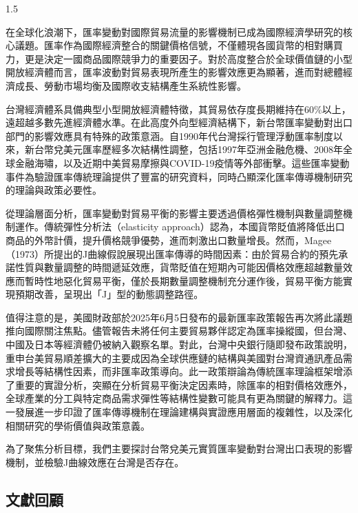 \documentclass[a4paper,12pt]{article}
\begin{document}
\begin{spacing}{1.5}

在全球化浪潮下，匯率變動對國際貿易流量的影響機制已成為國際經濟學研究的核心議題。匯率作為國際經濟整合的關鍵價格信號，不僅體現各國貨幣的相對購買力，更是決定一國商品國際競爭力的重要因子。對於高度整合於全球價值鏈的小型開放經濟體而言，匯率波動對貿易表現所產生的影響效應更為顯著，進而對總體經濟成長、勞動市場均衡及國際收支結構產生系統性影響。

台灣經濟體系具備典型小型開放經濟體特徵，其貿易依存度長期維持在60\%以上，遠超越多數先進經濟體水準。在此高度外向型經濟結構下，新台幣匯率變動對出口部門的影響效應具有特殊的政策意涵。自1990年代台灣採行管理浮動匯率制度以來，新台幣兌美元匯率歷經多次結構性調整，包括1997年亞洲金融危機、2008年全球金融海嘯，以及近期中美貿易摩擦與COVID-19疫情等外部衝擊。這些匯率變動事件為驗證匯率傳統理論提供了豐富的研究資料，同時凸顯深化匯率傳導機制研究的理論與政策必要性。

從理論層面分析，匯率變動對貿易平衡的影響主要透過價格彈性機制與數量調整機制運作。傳統彈性分析法（elasticity approach）認為，本國貨幣貶值將降低出口商品的外幣計價，提升價格競爭優勢，進而刺激出口數量增長。然而，Magee（1973）所提出的J曲線假說展現出匯率傳導的時間因素：由於貿易合約的預先承諾性質與數量調整的時間遞延效應，貨幣貶值在短期內可能因價格效應超越數量效應而暫時性地惡化貿易平衡，僅於長期數量調整機制充分運作後，貿易平衡方能實現預期改善，呈現出「J」型的動態調整路徑。

值得注意的是，美國財政部於2025年6月5日發布的最新匯率政策報告再次將此議題推向國際關注焦點。儘管報告未將任何主要貿易夥伴認定為匯率操縱國，但台灣、中國及日本等經濟體仍被納入觀察名單。對此，台灣中央銀行隨即發布政策說明，重申台美貿易順差擴大的主要成因為全球供應鏈的結構與美國對台灣資通訊產品需求增長等結構性因素，而非匯率政策導向。此一政策辯論為傳統匯率理論框架增添了重要的實證分析，突顯在分析貿易平衡決定因素時，除匯率的相對價格效應外，全球產業的分工與特定商品需求彈性等結構性變數可能具有更為關鍵的解釋力。這一發展進一步印證了匯率傳導機制在理論建構與實證應用層面的複雜性，以及深化相關研究的學術價值與政策意義。

為了聚焦分析目標，我們主要探討台幣兌美元實質匯率變動對台灣出口表現的影響機制，並檢驗J曲線效應在台灣是否存在。
\end{spacing}

\subsection{文獻回顧}
\end{document}
